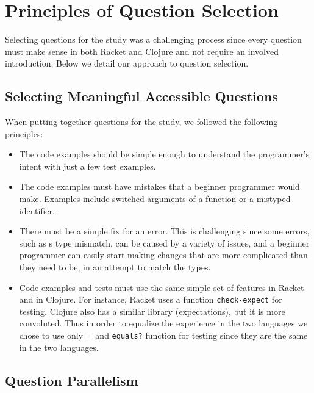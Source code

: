 \documentclass[submission,copyright,creativecommons]{eptcs}
\begin{document}
\section{Principles of Question Selection}\label{sec:select}
	Selecting questions for the study was a challenging process since every question must make sense in both Racket and Clojure and not require an involved introduction. Below we detail our approach to question selection.

	\subsection{Selecting Meaningful Accessible Questions}\label{sec:meaning}
	When putting together questions for the study, we followed the following principles:
	\begin{itemize}
	\item The code examples should be simple enough to understand the programmer's intent with just a few test examples. 
	\item The code examples must have mistakes that a beginner programmer would make. Examples include switched arguments of a function or a mistyped identifier. 
	\item There must be a simple fix for an error. This is challenging since some errors, such as s type mismatch, can be caused by a variety of issues, and a beginner
	programmer can easily start making changes that are more complicated than they need to be, in an attempt to match the types. 
	\item Code examples and tests must use the same simple set of features in Racket and in Clojure. For instance, Racket uses a function \texttt{check-expect} for testing. Clojure also has a similar library (expectations), but it is more convoluted. Thus in order to equalize the experience in the two languages we chose to use only = and \texttt{equals?} function for testing since they are the same in the two languages. 
	\end{itemize}


	\subsection{Question Parallelism}\label{sec:parallel}
	
\end{document}
